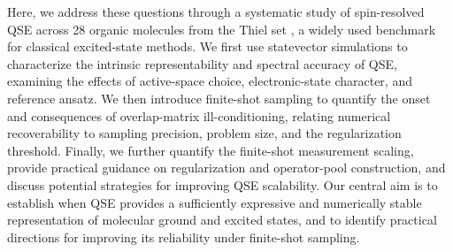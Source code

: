Here, we address these questions through a systematic study of spin-resolved QSE across 28 organic molecules from the Thiel set \cite{thiels2008benchmark}, a widely used benchmark for classical excited-state methods. 
We first use statevector simulations to characterize the intrinsic representability and spectral accuracy of QSE, examining the effects of active-space choice, electronic-state character, and reference ansatz. 
We then introduce finite-shot sampling to quantify the onset and consequences of overlap-matrix ill-conditioning, relating numerical recoverability to sampling precision, problem size, and the regularization threshold. 
Finally, we further quantify the finite-shot measurement scaling, provide practical guidance on regularization and operator-pool construction, and discuss potential strategies for improving QSE scalability. 
Our central aim is to establish when QSE provides a sufficiently expressive and numerically stable representation of molecular ground and excited states, and to identify practical directions for improving its reliability under finite-shot sampling.